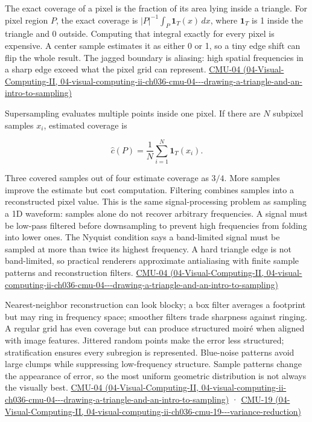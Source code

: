 The exact coverage of a pixel is the fraction of its area lying inside a triangle. For pixel region \(P\), the exact coverage is \(|P|^{-1}\int_P \mathbf 1_T(x)\,dx\), where \(\mathbf 1_T\) is 1 inside the triangle and 0 outside. Computing that integral exactly for every pixel is expensive. A center sample estimates it as either 0 or 1, so a tiny edge shift can flip the whole result. The jagged boundary is aliasing: high spatial frequencies in a sharp edge exceed what the pixel grid can represent. \href{../04-Visual-Computing-II/main.pdf\#nameddest=04-visual-computing-ii-ch036-cmu-04---drawing-a-triangle-and-an-intro-to-sampling}{CMU-04 (04-Visual-Computing-II, 04-visual-computing-ii-ch036-cmu-04-\/-\/-drawing-a-triangle-and-an-intro-to-sampling)}

Supersampling evaluates multiple points inside one pixel. If there are \(N\) subpixel samples \(x_i\), estimated coverage is

\[
\widehat c(P)=\frac1N\sum_{i=1}^N\mathbf 1_T(x_i).
\]

Three covered samples out of four estimate coverage as \(3/4\). More samples improve the estimate but cost computation. Filtering combines samples into a reconstructed pixel value. This is the same signal-processing problem as sampling a 1D waveform: samples alone do not recover arbitrary frequencies. A signal must be low-pass filtered before downsampling to prevent high frequencies from folding into lower ones. The Nyquist condition says a band-limited signal must be sampled at more than twice its highest frequency. A hard triangle edge is not band-limited, so practical renderers approximate antialiasing with finite sample patterns and reconstruction filters. \href{../04-Visual-Computing-II/main.pdf\#nameddest=04-visual-computing-ii-ch036-cmu-04---drawing-a-triangle-and-an-intro-to-sampling}{CMU-04 (04-Visual-Computing-II, 04-visual-computing-ii-ch036-cmu-04-\/-\/-drawing-a-triangle-and-an-intro-to-sampling)}

Nearest-neighbor reconstruction can look blocky; a box filter averages a footprint but may ring in frequency space; smoother filters trade sharpness against ringing. A regular grid has even coverage but can produce structured moiré when aligned with image features. Jittered random points make the error less structured; stratification ensures every subregion is represented. Blue-noise patterns avoid large clumps while suppressing low-frequency structure. Sample patterns change the appearance of error, so the most uniform geometric distribution is not always the visually best. \href{../04-Visual-Computing-II/main.pdf\#nameddest=04-visual-computing-ii-ch036-cmu-04---drawing-a-triangle-and-an-intro-to-sampling}{CMU-04 (04-Visual-Computing-II, 04-visual-computing-ii-ch036-cmu-04-\/-\/-drawing-a-triangle-and-an-intro-to-sampling)} · \href{../04-Visual-Computing-II/main.pdf\#nameddest=04-visual-computing-ii-ch036-cmu-19---variance-reduction}{CMU-19 (04-Visual-Computing-II, 04-visual-computing-ii-ch036-cmu-19-\/-\/-variance-reduction)}

